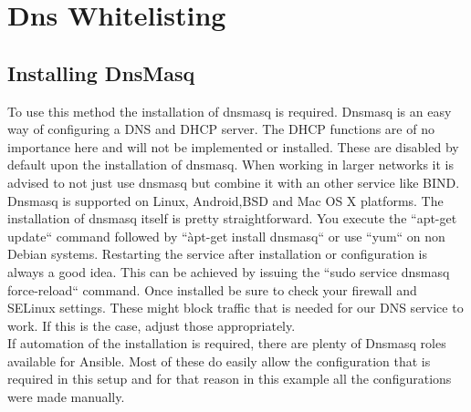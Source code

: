 \section{Dns Whitelisting}
\subsection{Installing DnsMasq}
To use this method the installation of dnsmasq is required. Dnsmasq is an easy way of configuring a DNS and DHCP server. The DHCP functions are of no importance here and will not be implemented or installed. These are disabled by default upon the installation of dnsmasq. When working in larger networks it is advised to not just use dnsmasq but combine it with an other service like BIND. Dnsmasq is supported on Linux, Android,BSD and Mac OS X platforms. The installation of dnsmasq itself is pretty straightforward. You execute the ``apt-get update`` command followed by ``àpt-get install dnsmasq`` or use ``yum`` on non Debian systems. Restarting the service after installation or configuration is always a good idea. This can be achieved by issuing the ``sudo service dnsmasq force-reload`` command. Once installed be sure to check your firewall and SELinux settings. These might block traffic that is needed for our DNS service to work. If this is the case, adjust those appropriately. \\
If automation of the installation is required, there are plenty of Dnsmasq roles available for Ansible. Most of these do easily allow the configuration that is required in this setup and for that reason in this example all the configurations were made manually.
